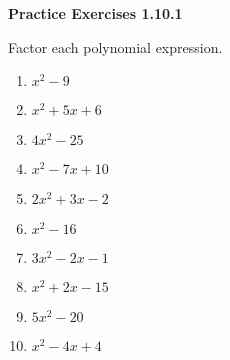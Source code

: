 \vspace{0.3ex}
\noindent\textbf{Practice Exercises 1.10.1}

\vspace{0.2ex}

Factor each polynomial expression.
\begin{multicols}{2}
\begin{enumerate}
    \item $x^2 - 9$
    \item $x^2 + 5x + 6$
    \item $4x^2 - 25$
    \item $x^2 - 7x + 10$
    \item $2x^2 + 3x - 2$
    \item $x^2 - 16$
    \item $3x^2 - 2x - 1$
    \item $x^2 + 2x - 15$
    \item $5x^2 - 20$
    \item $x^2 - 4x + 4$
\end{enumerate}
\end{multicols}
